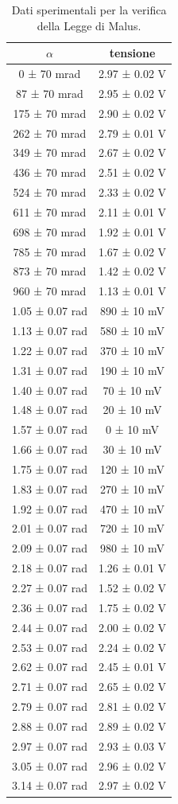 \documentclass[a4paper]{article}
\begin{document}
\begin{table}[htbp]
\centering
\begin{tabular}{|c|c|}
\hline
$\alpha$ & tensione \\\hline\hline
0 ± 70 mrad & 2.97 ± 0.02 V \\
87 ± 70 mrad & 2.95 ± 0.02 V \\
175 ± 70 mrad & 2.90 ± 0.02 V \\
262 ± 70 mrad & 2.79 ± 0.01 V \\
349 ± 70 mrad & 2.67 ± 0.02 V \\
436 ± 70 mrad & 2.51 ± 0.02 V \\
524 ± 70 mrad & 2.33 ± 0.02 V \\
611 ± 70 mrad & 2.11 ± 0.01 V \\
698 ± 70 mrad & 1.92 ± 0.01 V \\
785 ± 70 mrad & 1.67 ± 0.02 V \\
873 ± 70 mrad & 1.42 ± 0.02 V \\
960 ± 70 mrad & 1.13 ± 0.01 V \\
1.05 ± 0.07 rad & 890 ± 10 mV \\
1.13 ± 0.07 rad & 580 ± 10 mV \\
1.22 ± 0.07 rad & 370 ± 10 mV \\
1.31 ± 0.07 rad & 190 ± 10 mV \\
1.40 ± 0.07 rad & 70 ± 10 mV \\
1.48 ± 0.07 rad & 20 ± 10 mV \\
1.57 ± 0.07 rad & 0 ± 10 mV \\
1.66 ± 0.07 rad & 30 ± 10 mV \\
1.75 ± 0.07 rad & 120 ± 10 mV \\
1.83 ± 0.07 rad & 270 ± 10 mV \\
1.92 ± 0.07 rad & 470 ± 10 mV \\
2.01 ± 0.07 rad & 720 ± 10 mV \\
2.09 ± 0.07 rad & 980 ± 10 mV \\
2.18 ± 0.07 rad & 1.26 ± 0.01 V \\
2.27 ± 0.07 rad & 1.52 ± 0.02 V \\
2.36 ± 0.07 rad & 1.75 ± 0.02 V \\
2.44 ± 0.07 rad & 2.00 ± 0.02 V \\
2.53 ± 0.07 rad & 2.24 ± 0.02 V \\
2.62 ± 0.07 rad & 2.45 ± 0.01 V \\
2.71 ± 0.07 rad & 2.65 ± 0.02 V \\
2.79 ± 0.07 rad & 2.81 ± 0.02 V \\
2.88 ± 0.07 rad & 2.89 ± 0.02 V \\
2.97 ± 0.07 rad & 2.93 ± 0.03 V \\
3.05 ± 0.07 rad & 2.96 ± 0.02 V \\
3.14 ± 0.07 rad & 2.97 ± 0.02 V \\
\hline
\end{tabular}
\caption{Dati sperimentali per la verifica della Legge di Malus.}
\label{tab:dati_Malus}
\end{table}
\end{document}
